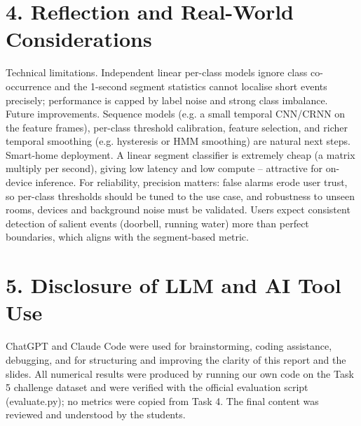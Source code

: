 \documentclass[10pt]{article}
\begin{document}
\section*{4. Reflection and Real-World Considerations}
Technical limitations. Independent linear per-class models ignore class co-occurrence and the 1-second segment statistics cannot localise short events precisely; performance is capped by label noise and strong class imbalance. Future improvements. Sequence models (e.g. a small temporal CNN/CRNN on the feature frames), per-class threshold calibration, feature selection, and richer temporal smoothing (e.g. hysteresis or HMM smoothing) are natural next steps. Smart-home deployment. A linear segment classifier is extremely cheap (a matrix multiply per second), giving low latency and low compute -- attractive for on-device inference. For reliability, precision matters: false alarms erode user trust, so per-class thresholds should be tuned to the use case, and robustness to unseen rooms, devices and background noise must be validated. Users expect consistent detection of salient events (doorbell, running water) more than perfect boundaries, which aligns with the segment-based metric.
\section*{5. Disclosure of LLM and AI Tool Use}
ChatGPT and Claude Code were used for brainstorming, coding assistance, debugging, and for structuring and improving the clarity of this report and the slides. All numerical results were produced by running our own code on the Task 5 challenge dataset and were verified with the official evaluation script (evaluate.py); no metrics were copied from Task 4. The final content was reviewed and understood by the students.
\end{document}
